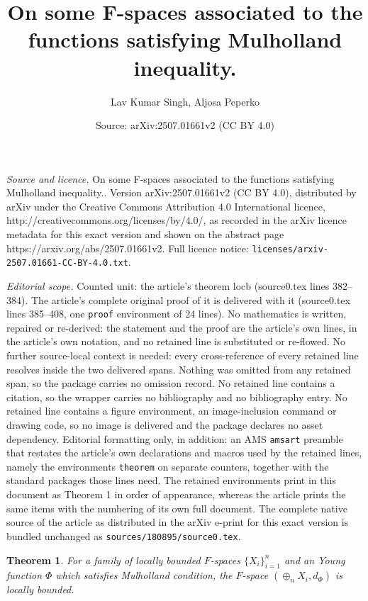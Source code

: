\documentclass[10pt,a4paper]{amsart}
\title{On some F-spaces associated to the functions satisfying Mulholland inequality.}
\author{Lav Kumar Singh, Aljosa Peperko}
\date{Source: arXiv:2507.01661v2 (CC BY 4.0)}
\newtheorem{theorem}{Theorem}
\begin{document}
\maketitle

\noindent\emph{Source and licence.} On some F-spaces associated to the functions satisfying Mulholland inequality.. Version arXiv:2507.01661v2 (CC BY 4.0), distributed by arXiv under the Creative Commons Attribution 4.0 International licence, http://creativecommons.org/licenses/by/4.0/, as recorded in the arXiv licence metadata for this exact version and shown on the abstract page https://arxiv.org/abs/2507.01661v2. Full licence notice: \texttt{licenses/arxiv-2507.01661-CC-BY-4.0.txt}.\par\smallskip

\noindent\textit{Editorial scope.} Counted unit: the article's theorem locb (source0.tex lines 382--384). The article's complete original proof of it is delivered with it (source0.tex lines 385--408, one \texttt{proof} environment of 24 lines). No mathematics is written, repaired or re-derived: the statement and the proof are the article's own lines, in the article's own notation, and no retained line is substituted or re-flowed.  No further source-local context is needed: every cross-reference of every retained line resolves inside the two delivered spans.  Nothing was omitted from any retained span, so the package carries no omission record.  No retained line contains a citation, so the wrapper carries no bibliography and no bibliography entry.  No retained line contains a figure environment, an image-inclusion command or drawing code, so no image is delivered and the package declares no asset dependency.  Editorial formatting only, in addition: an AMS \texttt{amsart} preamble that restates the article's own declarations and macros used by the retained lines, namely the environments \texttt{theorem} on separate counters, together with the standard packages those lines need.  The retained environments print in this document as Theorem 1 in order of appearance, whereas the article prints the same items with the numbering of its own full document.  The complete native source of the article as distributed in the arXiv e-print for this exact version is bundled unchanged as \texttt{sources/180895/source0.tex}.
	 \begin{theorem}\label{locb}
	 	For a family of locally bounded $F$-spaces $\{X_i\}_{i=1}^n$ and an Young function $\Phi$ which satisfies Mulholland condition, the $F$-space $\left(\oplus_nX_i,d_\Phi\right)$ is locally bounded.
	 \end{theorem}
\end{document}
